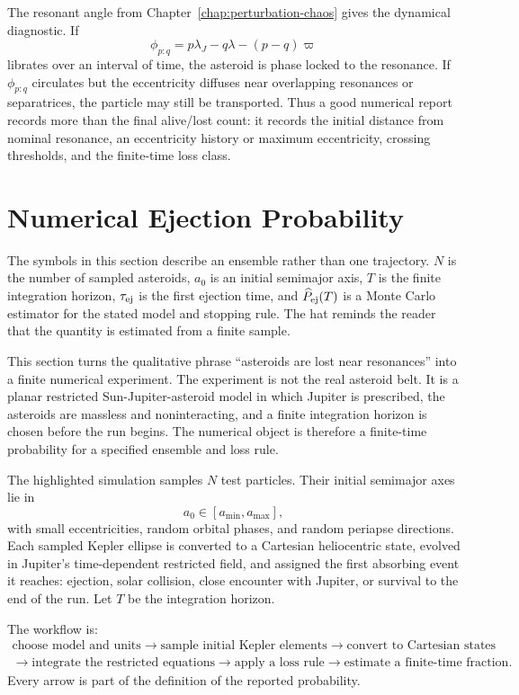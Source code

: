The resonant angle from Chapter~\ref{chap:perturbation-chaos} gives the
dynamical diagnostic.  If
\[
  \phi_{p:q}=p\lambda_J-q\lambda-(p-q)\varpi
\]
librates over an interval of time, the asteroid is phase locked to the
resonance.  If \(\phi_{p:q}\) circulates but the eccentricity diffuses near
overlapping resonances or separatrices, the particle may still be transported.
Thus a good numerical report records more than the final alive/lost count: it
records the initial distance from nominal resonance, an eccentricity history or
maximum eccentricity, crossing thresholds, and the finite-time loss class.

\section{Numerical Ejection Probability}
\label{sec:numerical-ejection-probability}

The symbols in this section describe an ensemble rather than one trajectory.
\(N\) is the number of sampled asteroids, \(a_0\) is an initial semimajor axis,
\(T\) is the finite integration horizon, \(\tau_{\rm ej}\) is the first
ejection time, and \(\widehat P_{\rm ej}(T)\) is a Monte Carlo estimator for
the stated model and stopping rule.  The hat reminds the reader that the
quantity is estimated from a finite sample.

This section turns the qualitative phrase ``asteroids are lost near
resonances'' into a finite numerical experiment.  The experiment is not the real
asteroid belt.  It is a planar restricted Sun-Jupiter-asteroid model in which
Jupiter is prescribed, the asteroids are massless and noninteracting, and a
finite integration horizon is chosen before the run begins.  The numerical
object is therefore a finite-time probability for a specified ensemble and loss
rule.

The highlighted simulation samples \(N\) test particles.  Their initial
semimajor axes lie in
\[
  a_0\in[a_{\min},a_{\max}],
\]
with small eccentricities, random orbital phases, and random periapse
directions.  Each sampled Kepler ellipse is converted to a Cartesian
heliocentric state, evolved in Jupiter's time-dependent restricted field, and
assigned the first absorbing event it reaches: ejection, solar collision, close
encounter with Jupiter, or survival to the end of the run. Let \(T\) be the
integration horizon.

The workflow is:
\[
\begin{gathered}
\text{choose model and units}
\longrightarrow
\text{sample initial Kepler elements}
\longrightarrow
\text{convert to Cartesian states}\\
\longrightarrow
\text{integrate the restricted equations}
\longrightarrow
\text{apply a loss rule}
\longrightarrow
\text{estimate a finite-time fraction}.
\end{gathered}
\]
Every arrow is part of the definition of the reported probability.

